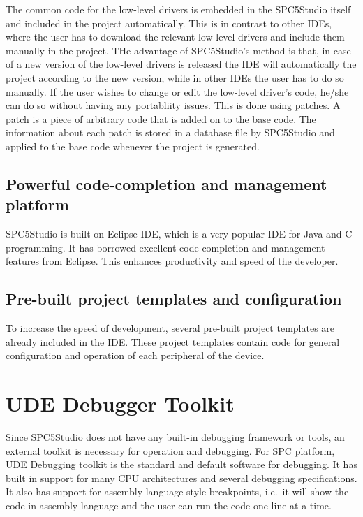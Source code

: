 \documentclass[]{book}
\begin{document}
The common code for the low-level drivers is embedded in the SPC5Studio
itself and included in the project automatically. This is in contrast to
other IDEs, where the user has to download the relevant low-level
drivers and include them manually in the project. THe advantage of
SPC5Studio's method is that, in case of a new version of the low-level
drivers is released the IDE will automatically the project according to
the new version, while in other IDEs the user has to do so manually. If
the user wishes to change or edit the low-level driver's code, he/she
can do so without having any portabliity issues. This is done using
patches. A patch is a piece of arbitrary code that is added on to the
base code. The information about each patch is stored in a database file
by SPC5Studio and applied to the base code whenever the project is
generated.

\subsection{Powerful code-completion and management
platform}\label{powerful-code-completion-and-management-platform}

SPC5Studio is built on Eclipse IDE, which is a very popular IDE for Java
and C programming. It has borrowed excellent code completion and
management features from Eclipse. This enhances productivity and speed
of the developer.

\subsection{Pre-built project templates and
configuration}\label{pre-built-project-templates-and-configuration}

To increase the speed of development, several pre-built project
templates are already included in the IDE. These project templates
contain code for general configuration and operation of each peripheral
of the device.

\section{UDE Debugger Toolkit}\label{ude-debugger-toolkit}

Since SPC5Studio does not have any built-in debugging framework or
tools, an external toolkit is necessary for operation and debugging. For
SPC platform, UDE Debugging toolkit is the standard and default software
for debugging. It has built in support for many CPU architectures and
several debugging specifications. It also has support for assembly
language style breakpoints, i.e.~it will show the code in assembly
language and the user can run the code one line at a time.
\end{document}
